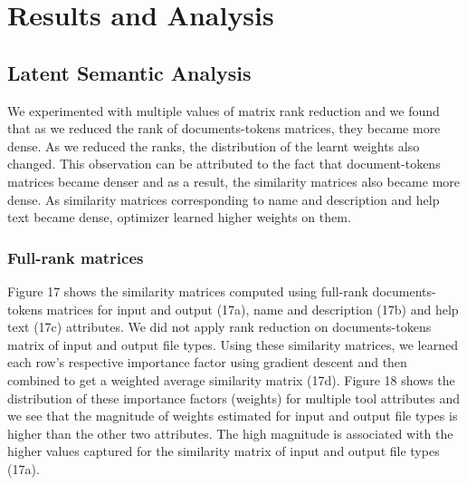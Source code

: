 \chapter{Results and Analysis}
\section{Latent Semantic Analysis}
We experimented with multiple values of matrix rank reduction and we found that as we reduced the rank of documents-tokens matrices, they became more dense. As we reduced the ranks, the distribution of the learnt weights also changed. This observation can be attributed to the fact that document-tokens matrices became denser and as a result, the similarity matrices also became more dense. As similarity matrices corresponding to name and description and help text became dense, optimizer learned higher weights on them. 

\subsection{Full-rank matrices}
Figure 17 shows the similarity matrices computed using full-rank documents-tokens matrices for input and output (17a), name and description (17b) and help text (17c) attributes. We did not apply rank reduction on documents-tokens matrix of input and output file types. Using these similarity matrices, we learned each row's respective importance factor using gradient descent and then combined to get a weighted average similarity matrix (17d). Figure 18 shows the distribution of these importance factors (weights) for multiple tool attributes and we see that the magnitude of weights estimated for input and output file types is higher than the other two attributes. The high magnitude is associated with the higher values captured for the similarity matrix of input and output file types (17a).

